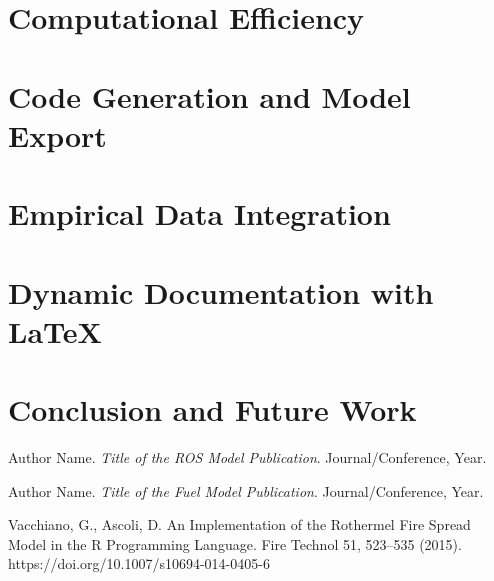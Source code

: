 \documentclass{article}
\begin{document}
\section{Computational Efficiency}

\section{Code Generation and Model Export}

\section{Empirical Data Integration}

\section{Dynamic Documentation with LaTeX}

\section{Conclusion and Future Work}


\begin{thebibliography}{9}
Author Name. 
\textit{Title of the ROS Model Publication}. 
Journal/Conference, Year.

Author Name. 
\textit{Title of the Fuel Model Publication}. 
Journal/Conference, Year.

Vacchiano, G., Ascoli, D. An Implementation of the Rothermel Fire Spread Model in the R Programming Language. Fire Technol 51, 523–535 (2015). https://doi.org/10.1007/s10694-014-0405-6


\end{thebibliography}
\end{document}
